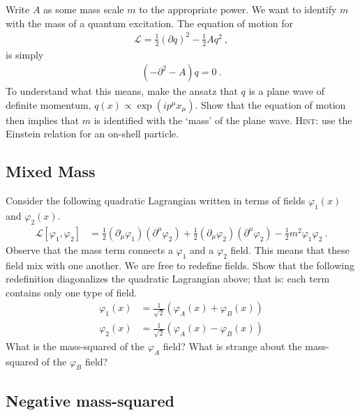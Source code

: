 \documentclass[12pt]{article}
\begin{document}
Write $A$ as some mass scale $m$ to the appropriate power. We want to identify $m$ with the mass of a quantum excitation. The equation of motion for
\begin{align}
	\mathcal L = \frac 12\left(\partial q\right)^2 - \frac 12 A q^2 \ ,
\end{align}
is simply
\begin{align}
	(-\partial^2 - A) q = 0 \ .
\end{align}
To understand what this means, make the ansatz that $q$ is a plane wave of definite momentum, $q(x)\propto \exp(ip^\mu x_\mu)$. Show that the equation of motion then implies that $m$ is identified with the `mass' of the plane wave. \textsc{Hint}: use the Einstein relation for an on-shell particle.



\subsection{Mixed Mass}

Consider the following quadratic Lagrangian written in terms of fields $\varphi_1(x)$ and $\varphi_2(x)$.
\begin{align}
	\mathcal L[\varphi_1, \varphi_2] &=
	\frac{1}{2}\left(\partial_\mu\varphi_1\right)
	\left(\partial^\mu\varphi_2\right)
	+
	\frac{1}{2}\left(\partial_\mu\varphi_2\right)
	\left(\partial^\mu\varphi_2\right)
	- \frac 12 m^2\varphi_1\varphi_2 \ .
\end{align}
Observe that the mass term connects a $\varphi_1$ and a $\varphi_2$ field. This means that these field mix with one another. We are free to redefine fields. Show that the following redefinition diagonalizes the quadratic Lagrangian above; that is: each term contains only one type of field.
\begin{align}
	\varphi_1(x) &= \frac{1}{\sqrt{2}}\left(\varphi_A(x) + \varphi_B(x) \right)
	\\
	\varphi_2(x) &= \frac{1}{\sqrt{2}}\left(\varphi_A(x) - \varphi_B(x) \right)
\end{align}
What is the mass-squared of the $\varphi_A$ field? What is strange about the mass-squared of the $\varphi_B$ field?

\subsection{Negative mass-squared}
\end{document}
